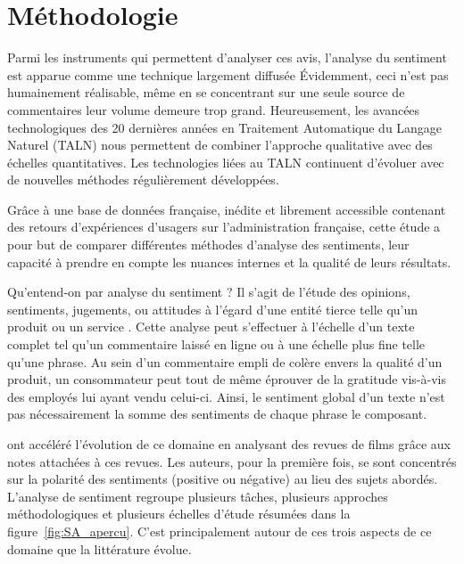 \documentclass[a4paper,12pt]{report}
\begin{document}
\chapter{Méthodologie}
Parmi les instruments qui permettent d'analyser ces avis, l'analyse du sentiment est apparue comme une technique largement diffusée %
Évidemment, ceci n'est pas humainement réalisable, même en se concentrant sur une seule source de commentaires leur volume demeure trop grand. Heureusement, les avancées technologiques des 20 dernières années en Traitement Automatique du Langage Naturel (TALN) nous permettent de combiner l'approche qualitative avec des échelles quantitatives. Les technologies liées au TALN continuent d'évoluer avec de nouvelles méthodes régulièrement développées. \par

Grâce à une base de données française, inédite et librement accessible contenant des retours d'expériences d'usagers sur l'administration française, cette étude a pour but de comparer différentes méthodes d'analyse des sentiments, leur capacité à prendre en compte les nuances internes et la qualité de leurs résultats.  \par

Qu'entend-on par analyse du sentiment ? Il s'agit de l'étude des opinions, sentiments, jugements, ou attitudes à l'égard d'une entité tierce telle qu'un produit ou un service \parencite{liu12}. Cette analyse peut s'effectuer à l'échelle d'un texte complet tel qu'un commentaire laissé en ligne ou à une échelle plus fine telle qu'une phrase. Au sein d'un commentaire empli de colère envers la qualité d'un produit, un consommateur peut tout de même éprouver de la gratitude vis-à-vis des employés lui ayant vendu celui-ci. Ainsi, le sentiment global d'un texte n'est pas nécessairement la somme des sentiments de chaque phrase le composant. \par 

\textcite{pang02} ont accéléré l'évolution de ce domaine en analysant des revues de films grâce aux notes attachées à ces revues. Les auteurs, pour la première fois, se sont concentrés sur la polarité des sentiments (positive ou négative) au lieu des sujets abordés. L'analyse de sentiment regroupe plusieurs tâches, plusieurs approches méthodologiques et plusieurs échelles d'étude résumées dans la figure~\ref{fig:SA_apercu}. C'est principalement autour de ces trois aspects de ce domaine que la littérature évolue. \par
\end{document}
